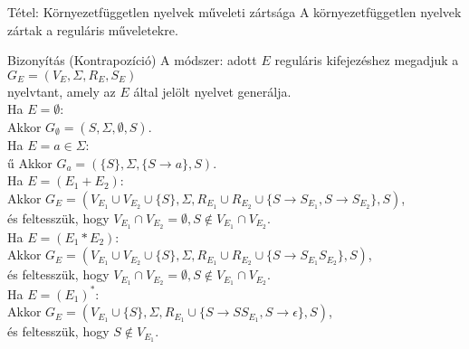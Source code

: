 \documentclass{beamer}
\begin{document}
\begin{frame}
\begin{block}{Tétel: Környezetfüggetlen nyelvek műveleti zártsága}
A környezetfüggetlen nyelvek zártak a reguláris műveletekre.
\end{block}

\begin{block}{Bizonyítás (Kontrapozíció)}
A módszer: adott $E$ reguláris kifejezéshez megadjuk a\\
$G_E = (V_E, {\Sigma}, R_E, S_E)$\\
nyelvtant, amely az $E$ által jelölt nyelvet generálja.\\
\bigskip
Ha $E = \emptyset$:\\
Akkor $G_{\emptyset} = ({S}, {\Sigma}, \emptyset, S)$.\\
\bigskip
Ha $E = a \in {\Sigma}$:\\ű
Akkor $G_a = (\{S\}, {\Sigma}, \{S \rightarrow a\}, S)$.\\
\bigskip
Ha $E = (E_1 + E_2)$:\\
Akkor $G_E = (V_{E_1} \cup V_{E_2} \cup \{S\}, \Sigma, R_{E_1} \cup R_{E_2} \cup \{S \rightarrow S_{E_1}, S \rightarrow S_{E_2}\}, S)$,\\
és feltesszük, hogy $V_{E_1} \cap V_{E_2} = {\emptyset}, S \notin V_{E_1} \cap V_{E_2}$.\\
\bigskip
Ha $E = (E_1 * E_2)$:\\
Akkor $G_E = (V_{E_1} \cup V_{E_2} \cup \{S\}, \Sigma, R_{E_1} \cup R_{E_2} \cup \{S \rightarrow S_{E_1}S_{E_2}\}, S)$,\\
és feltesszük, hogy $V_{E_1} \cap V_{E_2} = {\emptyset}, S \notin V_{E_1} \cap V_{E_2}$.\\
\bigskip
Ha $E = (E_1)^*$:\\
Akkor $G_E = (V_{E_1} \cup \{S\}, \Sigma, R_{E_1} \cup \{S \rightarrow SS_{E_1}, S \rightarrow \epsilon \}, S)$,\\
és feltesszük, hogy $S \notin V_{E_1}$.\\

\end{block}
\end{frame}
\end{document}
